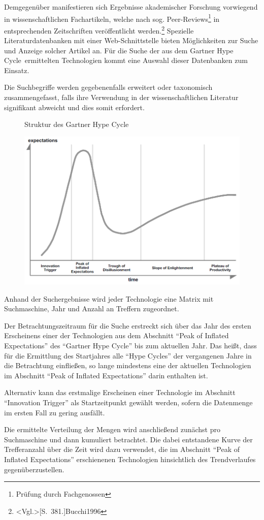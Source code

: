 Demgegenüber manifestieren sich Ergebnisse akademischer Forschung vorwiegend in wissenschaftlichen Fachartikeln, welche nach sog. \glqq Peer-Reviews\grqq \footnote{Prüfung durch Fachgenossen} in entsprechenden Zeitschriften veröffentlicht werden.\footnote{\citeNP<Vgl.>[S.~381.]{Bucchi1996}} Spezielle Literaturdatenbanken mit einer Web-Schnittstelle bieten Möglichkeiten zur Suche und Anzeige solcher Artikel an. Für die Suche der aus dem \glqq Gartner Hype Cycle\grqq~ermittelten Technologien kommt eine Auswahl dieser Datenbanken zum Einsatz.

Die Suchbegriffe werden gegebenenfalls erweitert oder taxonomisch zusammengefasst, falls ihre Verwendung in der wissenschaftlichen Literatur signifikant abweicht und dies somit erfordert.

\begin{figure}[h]
	\centering
	\caption{Struktur des \glqq Gartner Hype Cycle\grqq}
	\includegraphics[width=0.9\linewidth]{img/ghc_raw}
	\caption*{\protect\fullciteNP<Quelle:>[S.~4]{Fenn2017}}
	\label{fig:ghc_raw}
\end{figure}

Anhand der Suchergebnisse wird jeder Technologie eine Matrix mit Suchmaschine, Jahr und Anzahl an Treffern zugeordnet. 

Der Betrachtungszeitraum für die Suche erstreckt sich über das Jahr des ersten Erscheinens einer der Technologien aus dem Abschnitt "`Peak of Inflated Expectations"' des "`Gartner Hype Cycle"' bis zum aktuellen Jahr. Das heißt, dass für die Ermittlung des Startjahres alle "`Hype Cycles"' der vergangenen Jahre in die Betrachtung einfließen, so lange mindestens eine der aktuellen Technologien im Abschnitt "`Peak of Inflated Expectations"' darin enthalten ist.

Alternativ kann das erstmalige Erscheinen einer Technologie im Abschnitt "`Innovation Trigger"' als Startzeitpunkt gewählt werden, sofern die Datenmenge im ersten Fall zu gering ausfällt.

Die ermittelte Verteilung der Mengen wird anschließend zunächst pro Suchmaschine und dann kumuliert betrachtet. Die dabei entstandene Kurve der Trefferanzahl über die Zeit wird dazu verwendet, die im Abschnitt "`Peak of Inflated Expectations"' erschienenen Technologien hinsichtlich des Trendverlaufes gegenüberzustellen.